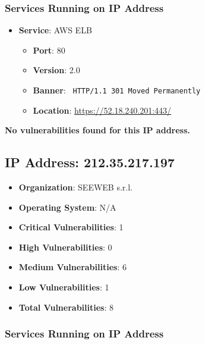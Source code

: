 \documentclass{article}
\begin{document}
\subsubsection*{Services Running on IP Address}

\begin{itemize}
    
        \item \textbf{Service}: AWS ELB
        \begin{itemize}
            \item \textbf{Port}: 80
            \item \textbf{Version}:  2.0 
            \item \textbf{Banner}: \texttt{
                HTTP/1.1 301 Moved Permanently
            }
            \item \textbf{Location}: \href{ https://52.18.240.201:443/ }{ https://52.18.240.201:443/ }
        \end{itemize}
    
\end{itemize}


\textbf{No vulnerabilities found for this IP address.}




\clearpage



\subsection*{IP Address: 212.35.217.197}

\begin{itemize}
    \item \textbf{Organization}: SEEWEB s.r.l.
    \item \textbf{Operating System}:  N/A 
    \item \textbf{Critical Vulnerabilities}: 1
    \item \textbf{High Vulnerabilities}: 0
    \item \textbf{Medium Vulnerabilities}: 6
    \item \textbf{Low Vulnerabilities}: 1
    \item \textbf{Total Vulnerabilities}: 8
\end{itemize}

\subsubsection*{Services Running on IP Address}
\end{document}
